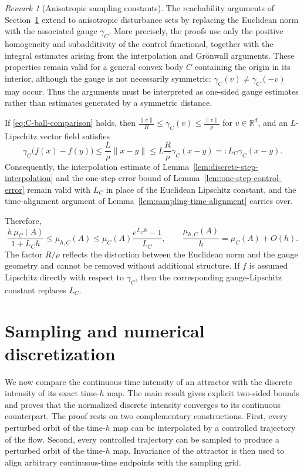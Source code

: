 \documentclass[pdflatex,sn-mathphys-num]{sn-jnl}
\numberwithin{equation}{section}
\theoremstyle{thmstyleone}%
\theoremstyle{definition}
\theoremstyle{remark}
\newtheorem{remark}[theorem]{Remark}
\begin{document}
\begin{remark}[Anisotropic sampling constants]
\label{rem:anisotropic-sampling-constants}
The reachability arguments of Section~\ref{sec:sampling} extend to anisotropic disturbance sets by replacing the Euclidean norm with the associated gauge $\gamma_C$. More precisely, the proofs use only the positive homogeneity and subadditivity of the control functional, together with the integral estimates arising from the interpolation and Gr\"onwall arguments. These properties remain valid for a general convex body $C$ containing the origin in its interior, although the gauge is not necessarily symmetric: $\gamma_C(v)\neq \gamma_C(-v)$ may occur. Thus the arguments must be interpreted as one-sided gauge estimates rather than estimates generated by a symmetric distance.

If \eqref{eq:C-ball-comparison} holds, then $\frac{\|v\|}{R} \leq \gamma_C(v) \leq \frac{\|v\|}{\rho}$ for $v\in\mathbb R^d$, and an $L$-Lipschitz vector field satisfies
\[
    \gamma_C\bigl(f(x)-f(y)\bigr)
    \leq
    \frac{L}{\rho}\|x-y\|
    \leq
    L\frac{R}{\rho}\gamma_C(x-y)
    =:
    L_C\gamma_C(x-y).
\]
Consequently, the interpolation estimate of
Lemma~\ref{lem:discrete-step-interpolation} and the one-step error bound
of Lemma~\ref{lem:one-step-control-error} remain valid with $L_C$ in
place of the Euclidean Lipschitz constant, and the time-alignment
argument of Lemma~\ref{lem:sampling-time-alignment} carries over.

Therefore,
\[
    \frac{h\,\mu_C(A)}{1+L_Ch}
    \leq
    \mu_{h,C}(A)
    \leq
    \mu_C(A)\frac{e^{L_Ch}-1}{L_C},
    \qquad
    \frac{\mu_{h,C}(A)}{h}
    =
    \mu_C(A)+O(h).
\]
The factor $R/\rho$ reflects the distortion between the Euclidean norm
and the gauge geometry and cannot be removed without additional
structure. If $f$ is assumed Lipschitz directly with respect to
$\gamma_C$, then the corresponding gauge-Lipschitz constant replaces
$L_C$.
\end{remark}

\section{Sampling and numerical discretization}
\label{sec:sampling}

We now compare the continuous-time intensity of an attractor with the
discrete intensity of its exact time-$h$ map. The main result gives
explicit two-sided bounds and proves that the normalized discrete
intensity converges to its continuous counterpart. The proof rests on
two complementary constructions. First, every perturbed orbit of the
time-$h$ map can be interpolated by a controlled trajectory of the
flow. Second, every controlled trajectory can be sampled to produce a
perturbed orbit of the time-$h$ map. Invariance of the attractor is
then used to align arbitrary continuous-time endpoints with the
sampling grid.
\end{document}
